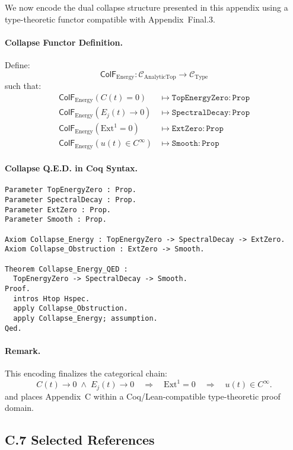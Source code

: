 \documentclass[11pt]{article}
\begin{document}
We now encode the dual collapse structure presented in this appendix using a type-theoretic functor compatible with Appendix~Final.3.

\paragraph{Collapse Functor Definition.}
Define:
\[
\mathsf{ColF}_{\mathrm{Energy}} : \mathcal{C}_{\mathrm{AnalyticTop}} \to \mathcal{C}_{\mathrm{Type}}
\]
such that:
\[
\begin{aligned}
\mathsf{ColF}_{\mathrm{Energy}}(C(t) = 0) &\mapsto \texttt{TopEnergyZero} : \texttt{Prop} \\
\mathsf{ColF}_{\mathrm{Energy}}(E_j(t) \to 0) &\mapsto \texttt{SpectralDecay} : \texttt{Prop} \\
\mathsf{ColF}_{\mathrm{Energy}}(\mathrm{Ext}^1 = 0) &\mapsto \texttt{ExtZero} : \texttt{Prop} \\
\mathsf{ColF}_{\mathrm{Energy}}(u(t) \in C^\infty) &\mapsto \texttt{Smooth} : \texttt{Prop}
\end{aligned}
\]

\paragraph{Collapse Q.E.D. in Coq Syntax.}

\begin{lstlisting}[language=Coq, caption=Persistent Collapse in Coq Type Theory]
Parameter TopEnergyZero : Prop.
Parameter SpectralDecay : Prop.
Parameter ExtZero : Prop.
Parameter Smooth : Prop.

Axiom Collapse_Energy : TopEnergyZero -> SpectralDecay -> ExtZero.
Axiom Collapse_Obstruction : ExtZero -> Smooth.

Theorem Collapse_Energy_QED :
  TopEnergyZero -> SpectralDecay -> Smooth.
Proof.
  intros Htop Hspec.
  apply Collapse_Obstruction.
  apply Collapse_Energy; assumption.
Qed.
\end{lstlisting}

\paragraph{Remark.}
This encoding finalizes the categorical chain:
\[
C(t) \to 0 \;\wedge\; E_j(t) \to 0 \quad \Rightarrow \quad \mathrm{Ext}^1 = 0 \quad \Rightarrow \quad u(t) \in C^\infty.
\]
and places Appendix~C within a Coq/Lean-compatible type-theoretic proof domain.


\subsection*{C.7 Selected References}
\end{document}
